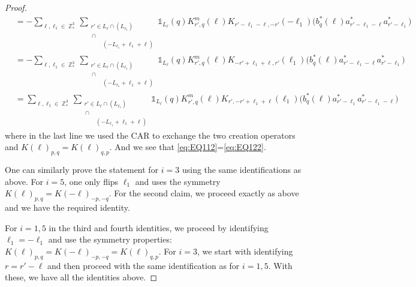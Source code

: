 \documentclass[sn-mathphys, Numbered ,a4paper]{sn-jnl}%
\DeclareMathOperator{\Z}{\mathbb{Z}}
\theoremstyle{plain}
\theoremstyle{definition}
\theoremstyle{remark}
\theoremstyle{plain}
\theoremstyle{definition}
\theoremstyle{remark}
\begin{document}
\begin{proof}
\begin{align}
		&=-\sum\limits_{\ell, \ell_1\in \Z^3_*}\sum\limits_{\substack{r' \in  L_{\ell} \cap (L_{\ell_1}) \\ \, \cap\\ \phantom{r'\in}  (-L_{\ell_1}+\ell_1+\ell)}} \!\!\!\! \mathds{1}_{L_\ell}(q) K^{m}_{r',q}(\ell) K_{r'-\ell_1-\ell,-r'}(-\ell_1)\Big( b^*_{q}(\ell) a^*_{r'-\ell_1-\ell}a^*_{r'-\ell_1}\Big)\nonumber\\
		&=-\sum\limits_{\ell, \ell_1\in \Z^3_*}\sum\limits_{\substack{r' \in  L_{\ell} \cap (L_{\ell_1}) \\ \, \cap\\ \phantom{r'\in}  (-L_{\ell_1}+\ell_1+\ell)}} \!\!\!\! \mathds{1}_{L_\ell}(q) K^{m}_{r',q}(\ell) K_{-r'+\ell_1+\ell,r'}(\ell_1)\Big( b^*_{q}(\ell) a^*_{r'-\ell_1-\ell}a^*_{r'-\ell_1}\Big)\nonumber\\
		&=\sum\limits_{\ell, \ell_1\in \Z^3_*}\sum\limits_{\substack{r' \in  L_{\ell} \cap (L_{\ell_1}) \\ \, \cap\\ \phantom{r'\in}  (-L_{\ell_1}+\ell_1+\ell)}} \!\!\!\! \mathds{1}_{L_\ell}(q) K^{m}_{r',q}(\ell) K_{r',-r'+\ell_1+\ell}(\ell_1)\Big( b^*_{q}(\ell) a^*_{r'-\ell_1} a^*_{r'-\ell_1-\ell}\Big)\label{eq:EQ122} 
	\end{align}
where in the last line we used the CAR to exchange the two creation operators and $K(\ell)_{p,q}=K(\ell)_{q,p}$. And we see that \eqref{eq:EQ112}=\eqref{eq:EQ122}.

One can similarly prove the statement for $i = 3$ using the same identifications as above. For $i = 5$, one only flips $\ell_1$ and uses the symmetry  $K(\ell)_{p,q} = K(-\ell)_{-p,-q}$. For the second claim, we proceed exactly as above and we have the required identity.

For $i=1,5$ in the third and fourth identities, we proceed by identifying $\ell_1=-\ell_1$ and use the symmetry properties: $K(\ell)_{p,q} = K(-\ell)_{-p,-q}= K(\ell)_{q,p}$.  For $i=3$, we start with identifying $r=r'-\ell$ and then proceed with the same identification as for $i=1,5$. With these, we have all the identities above.
\end{proof}
\end{document}
